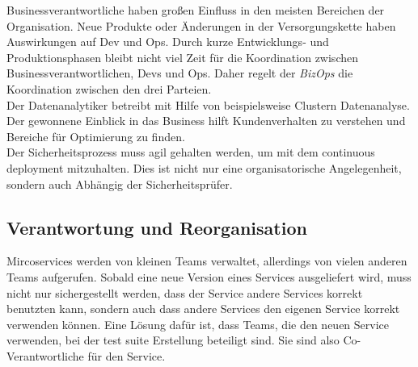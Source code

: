 Businessverantwortliche haben großen Einfluss in den meisten Bereichen der Organisation. Neue Produkte oder Änderungen in der Versorgungskette haben Auswirkungen auf Dev und Ops. Durch kurze Entwicklungs- und Produktionsphasen bleibt nicht viel Zeit für die Koordination zwischen Businessverantwortlichen, Devs und Ops. Daher regelt der \textit{BizOps} die Koordination zwischen den drei Parteien.\\
Der Datenanalytiker betreibt mit Hilfe von beispielsweise Clustern Datenanalyse. Der gewonnene Einblick in das Business hilft Kundenverhalten zu verstehen und Bereiche für Optimierung zu finden.\\
Der Sicherheitsprozess muss agil gehalten werden, um mit dem continuous deployment mitzuhalten. Dies ist nicht nur eine organisatorische Angelegenheit, sondern auch Abhängig der Sicherheitsprüfer.

\subsection{Verantwortung und Reorganisation}

Mircoservices werden von kleinen Teams verwaltet, allerdings von vielen anderen Teams aufgerufen. Sobald eine neue Version eines Services ausgeliefert wird, muss nicht nur sichergestellt werden, dass der Service andere Services korrekt benutzten kann, sondern auch dass andere Services den eigenen Service korrekt verwenden können. Eine Lösung dafür ist, dass Teams, die den neuen Service verwenden, bei der test suite Erstellung beteiligt sind. Sie sind also Co-Verantwortliche für den Service. 

